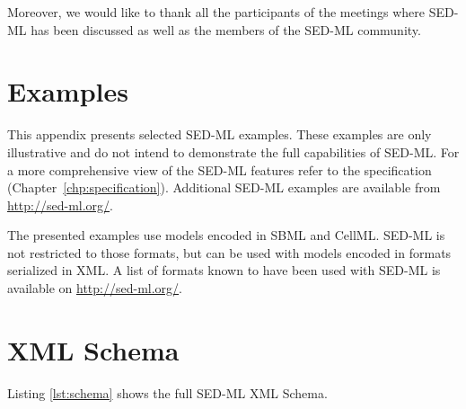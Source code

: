 \documentclass[pdftex,rgb,dvipsnames,svgnames,hyperref,table]{report}
\begin{document}
Moreover, we would like to thank all the participants of the meetings where SED-ML has been discussed as well as the members of the SED-ML community.


\appendix

\chapter{Examples}
\label{app:examples}
This appendix presents selected SED-ML examples. These examples are only illustrative and do not intend to demonstrate the full capabilities of SED-ML. For a more comprehensive view of the SED-ML features refer to the specification (Chapter~\ref{chp:specification}). Additional SED-ML examples are available from \url{http://sed-ml.org/}.

The presented examples use models encoded in SBML and CellML. SED-ML is not restricted to those formats, but can be used with models encoded in formats serialized in XML. A list of formats known to have been used with SED-ML is available on \url{http://sed-ml.org/}.







\chapter{XML Schema}
\label{app:schema}
Listing \ref{lst:schema} shows the full SED-ML XML Schema.



\end{document}
